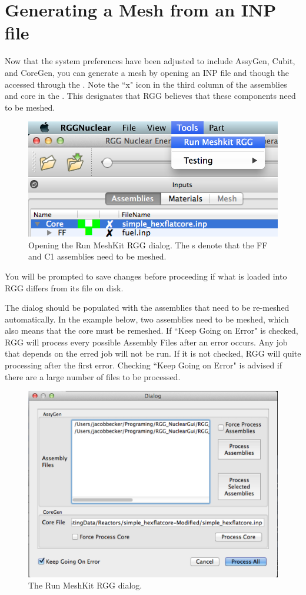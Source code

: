 \section{Generating a Mesh from an INP file}

Now that the system preferences have been adjusted to include AssyGen, Cubit, and CoreGen, you can generate a mesh by opening an INP file and though the  accessed through the .  Note the ``x" icon in the third column of the assemblies and core in the .  This designates that RGG believes that these components need to be meshed.

\begin{figure}[H]
	\begin{center}
		\includegraphics[width=0.5\linewidth]{Images/mesh-3.png}
		\caption{Opening the Run MeshKit RGG dialog.  The s denote that the FF and C1 assemblies need to be meshed.}
		\label{fig:Mesh3}
	\end{center}
\end{figure}

You will be prompted to save changes before proceeding if what is loaded into RGG differs from its file on disk.

The dialog should be populated with the assemblies that need to be re-meshed automatically.  In the example below, two assemblies need to be meshed, which also means that the core must be remeshed.  If ``Keep Going on Error" is checked, RGG will process every possible Assembly Files after an error occurs.  Any job that depends on the erred job will not be run.  If it is not checked, RGG will quite processing after the first error.  Checking ``Keep Going on Error" is advised if there are a large number of files to be processed.

\begin{figure}[H]
	\begin{center}
		\includegraphics[width=0.5\linewidth]{Images/mesh-4.png}
		\caption{The Run MeshKit RGG dialog.}
		\label{fig:Mesh4}
	\end{center}
\end{figure}

